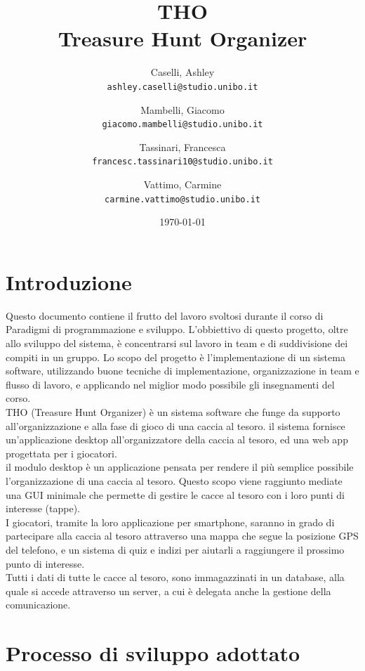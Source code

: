 \documentclass[12pt, italian]{article}
\title{\textbf{THO\\Treasure Hunt Organizer}}
\author{
	Caselli, Ashley\\
	\texttt{ashley.caselli@studio.unibo.it}
	\and
	Mambelli, Giacomo\\
	\texttt{giacomo.mambelli@studio.unibo.it}
	\and
	Tassinari, Francesca\\
	\texttt{francesc.tassinari10@studio.unibo.it}
	\and
	Vattimo, Carmine\\
	\texttt{carmine.vattimo@studio.unibo.it}
}
\date{\today}
\begin{document}
\maketitle
\newpage
\tableofcontents
\newpage

\section{Introduzione}
Questo documento contiene il frutto del lavoro svoltosi durante il corso di Paradigmi di programmazione e sviluppo. L'obbiettivo di questo progetto, oltre allo sviluppo del sistema, è concentrarsi sul lavoro in team e di suddivisione dei compiti in un gruppo. 
Lo scopo del progetto è l'implementazione di un sistema software, utilizzando buone tecniche di implementazione, organizzazione in team e flusso di lavoro, e applicando nel miglior modo possibile gli insegnamenti del corso.\\

THO (Treasure Hunt Organizer) è un sistema software che funge da supporto all'organizzazione e alla fase di gioco di una caccia al tesoro. il sistema fornisce un'applicazione desktop all'organizzatore della caccia al tesoro, ed una web app progettata per i giocatori.\\
il modulo desktop è un applicazione pensata per rendere il più semplice possibile l'organizzazione di una caccia al tesoro. Questo scopo viene raggiunto mediate una GUI minimale che permette di gestire le cacce al tesoro con i loro punti di interesse (tappe).\\

I giocatori, tramite la loro applicazione per smartphone, saranno in grado di partecipare alla caccia al tesoro attraverso una mappa che segue la posizione GPS del telefono, e un sistema di quiz e indizi per aiutarli a raggiungere il prossimo punto di interesse.\\
Tutti i dati di tutte le cacce al tesoro, sono immagazzinati in un database, alla quale si accede attraverso un server, a cui è delegata anche la gestione della comunicazione.

\section{Processo di sviluppo adottato}
\end{document}
